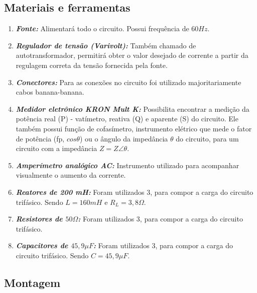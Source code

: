 \documentclass[a4paper,12pt,oneside,openany,table,xcdraw]{article}
\begin{document}
\subsection{Materiais e ferramentas} %
\begin{enumerate}[1 -]
\item \emph{\textbf{Fonte:}}
Alimentará todo o circuito. Possui frequência de $60Hz$.

\item \emph{\textbf{Regulador de tensão (Varivolt):}}
Também chamado de autotransformador, permitirá obter o valor desejado de corrente a partir da regulagem correta da tensão fornecida pela fonte.

\item \emph{\textbf{Conectores:}}
Para as conexões no circuito foi utilizado majoritariamente cabos banana-banana.

\item \emph{\textbf{Medidor eletrônico KRON Mult K:}}
Possibilita encontrar a medição da potência real (P) - vatímetro, reativa (Q) e aparente (S) do circuito. Ele também possui função de cofasímetro, instrumento elétrico que mede o fator de potência (fp, $cos\theta$) ou o ângulo da impedância $\theta$ do circuito, para um circuito com a impedância $Z = Z\angle \theta$.

\item \emph{\textbf{Amperímetro analógico AC:}}
Instrumento utilizado para acompanhar visualmente o aumento da corrente.

\item \emph{\textbf{Reatores de 200 mH:}}
Foram utilizados 3, para compor a carga do circuito trifásico. Sendo $L=160mH$ e $R_L=3,8\Omega$.

\item \emph{\textbf{Resistores de $50\Omega$:}}
Foram utilizados 3, para compor a carga do circuito trifásico.

\item \emph{\textbf{Capacitores de $45,9\mu F$:}}
Foram utilizados 3, para compor a carga do circuito trifásico. Sendo $C= 45,9\mu F$. %

\end{enumerate}

\subsection{Montagem} %
\end{document}
